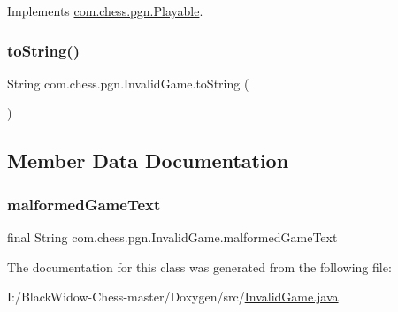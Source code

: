 Implements \mbox{\hyperlink{interfacecom_1_1chess_1_1pgn_1_1_playable_a57cbba467e07e07bf9fe35144a970ce6}{com.\+chess.\+pgn.\+Playable}}.

\mbox{\label{classcom_1_1chess_1_1pgn_1_1_invalid_game_a3070fc9933a8b0b7a9f587fb15e670fc}} 
\subsubsection{\texorpdfstring{toString()}{toString()}}
{\footnotesize\ttfamily String com.\+chess.\+pgn.\+Invalid\+Game.\+to\+String (\begin{DoxyParamCaption}{ }\end{DoxyParamCaption})}



\subsection{Member Data Documentation}
\mbox{\label{classcom_1_1chess_1_1pgn_1_1_invalid_game_ab7e96fc7a82d4999cb47351b0218fbba}} 
\subsubsection{\texorpdfstring{malformedGameText}{malformedGameText}}
{\footnotesize\ttfamily final String com.\+chess.\+pgn.\+Invalid\+Game.\+malformed\+Game\+Text\hspace{0.3cm}{\ttfamily [package]}}



The documentation for this class was generated from the following file\+:\begin{DoxyCompactItemize}
\item 
I\+:/\+Black\+Widow-\/\+Chess-\/master/\+Doxygen/src/\mbox{\hyperlink{_invalid_game_8java}{Invalid\+Game.\+java}}\end{DoxyCompactItemize}
